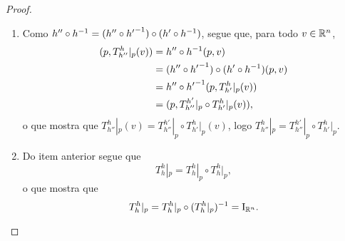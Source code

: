 \begin{proof}
	\begin{enumerate}
	\item Como $h'' \circ h^{-1} = (h'' \circ {h'}^{-1}) \circ (h' \circ h^{-1})$, segue que, para todo $v \in \mathbb{R}^n$,
		\begin{align*}
		(p,T^h_{h''}|_p(v)) &= h'' \circ h^{-1} (p,v) \\
			&= (h'' \circ {h'}^{-1}) \circ (h' \circ h^{-1}) (p,v) \\
			&= h'' \circ {h'}^{-1}(p,T^h_{h'}|_p(v)) \\
			&= (p,T^{h'}_{h''}|_p \circ T^h_{h'}|_p (v)),
		\end{align*}
o que mostra que $T^h_{h''}|_p(v) = T^{h'}_{h''}|_p \circ T^h_{h'}|_p (v)$, logo $T^h_{h''}|_p = T^{h'}_{h''}|_p \circ T^h_{h'}|_p$.

	\item Do item anterior segue que
		\begin{equation*}
		T^h_h|_p = T^h_h|_p \circ T^h_h|_p,
		\end{equation*}
o que mostra que
		\begin{equation*}
		T^h_h|_p = T^h_h|_p \circ (T^h_h|_p)^{-1} = \mathrm{I}_{\mathbb{R}^n}.
		\end{equation*}

\begin{comment}
Como $h \circ h\inv = \Id$, segue que, para todo $v \in \R^n$,
		\begin{equation*}
		(p,v) = h \circ h\inv(p,v) = (p,T^h_h|_p (v)),
		\end{equation*}
o que mostra que $v = T^h_h|_p (v)$, logo $T^h_h|_p = \Id_{\R^n}$.

	\item Dos itens anteriores segue que
		\begin{equation*}
		T^{h'}_h|_p \circ T_h^{h'}|_p = T^h_h|_p = \Id_{\R^n}
		\end{equation*}
e
		\begin{equation*}
		T^h_{h'}|_p \circ T^{h'}_h|_p = T^{h'}_{h'}|_p = \Id_{\R^n},
		\end{equation*}
logo $T^{h'}_h|_p = {T^h_{h'}|_p}\inv$.


\end{comment}
\end{enumerate}
\end{proof}
